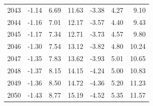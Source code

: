\begin{table}
\begin{tabular}{lrrrrrr}
2043 & -1.14 & 6.69 & 11.63 & -3.38 & 4.27 & 9.10 \\
2044 & -1.16 & 7.01 & 12.17 & -3.57 & 4.40 & 9.43 \\
2045 & -1.17 & 7.34 & 12.71 & -3.73 & 4.57 & 9.80 \\
2046 & -1.30 & 7.54 & 13.12 & -3.82 & 4.80 & 10.24 \\
2047 & -1.35 & 7.83 & 13.62 & -3.93 & 5.01 & 10.65 \\
2048 & -1.37 & 8.15 & 14.15 & -4.24 & 5.00 & 10.83 \\
2049 & -1.36 & 8.50 & 14.72 & -4.36 & 5.20 & 11.23 \\
2050 & -1.43 & 8.77 & 15.19 & -4.52 & 5.35 & 11.57 \\
\bottomrule
\end{tabular}
\end{table}
